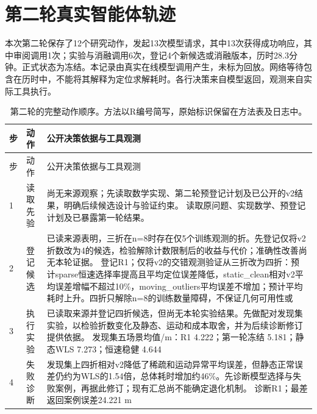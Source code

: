 \section{第二轮真实智能体轨迹}

\label{sec:revision-trace}

本次第二轮保存了12个研究动作，发起13次模型请求，其中13次获得成功响应，其中审阅调用1次；实验与消融调用6次，登记4个新候选或消融版本，历时28.3分钟。正式状态为冻结。本记录由真实在线模型调用产生，未标为回放。网络等待包含在历时中，不能将其解释为定位求解耗时。各行决策来自模型返回，观测来自实际工具执行。

\begingroup\small\setlength{\tabcolsep}{4pt}

\begin{longtable}{@{}p{8mm}p{21mm}p{\dimexpr\linewidth-29mm-16pt\relax}@{}}

\caption{第二轮的完整动作顺序。方法以R编号简写，原始标识保留在方法表及日志中。}\\

\toprule 步 & 动作 & 公开决策依据与工具观测\\\midrule\endfirsthead

\toprule 步 & 动作 & 公开决策依据与工具观测\\\midrule\endhead

1 & 读取先验 & 尚无来源观察；先读取数学实现、第二轮预登记计划及已公开的v2结果，明确后续候选设计与验证约束。 读取原问题、实现数学、预登记计划及已暴露第一轮结果。\\[3pt]

2 & 登记候选 & 已读来源表明，三折在n=8时存在仅5个训练观测的折。先登记仅将v2折数改为4的候选，检验解除计数限制后的收益与代价；准确性改善尚无本轮证据。 登记R1；仅将v2的交错观测验证从三折改为四折：预计sparse恒速选择率提高且平均定位误差降低，static\_\allowbreak{}clean相对v2平均误差增幅不超过10\%，moving\_\allowbreak{}outliers平均误差不增加；预计平均耗时上升。四折只解除n=8的训练数量障碍，不保证几何可用性或\\[3pt]

3 & 执行实验 & 已读取来源并登记四折候选，但尚无本轮实验结果。先做配对发现集实验，以检验折数变化及静态、运动和成本取舍，并为后续诊断修订提供依据。 发现集五场景均值/m：R1 4.222；第一轮冻结 5.181；静态WLS 7.273；恒速稳健 4.644\\[3pt]

4 & 失败诊断 & 发现集上四折相对v2降低了稀疏和运动异常平均误差，但静态正常误差仍约为WLS的1.54倍，总体耗时增加约46\%。先诊断模型选择与失败案例，再据此修订；现有汇总尚不能确定退化机制。 诊断R1；最差返回案例误差24.221 m\\[3pt]


\end{longtable}
